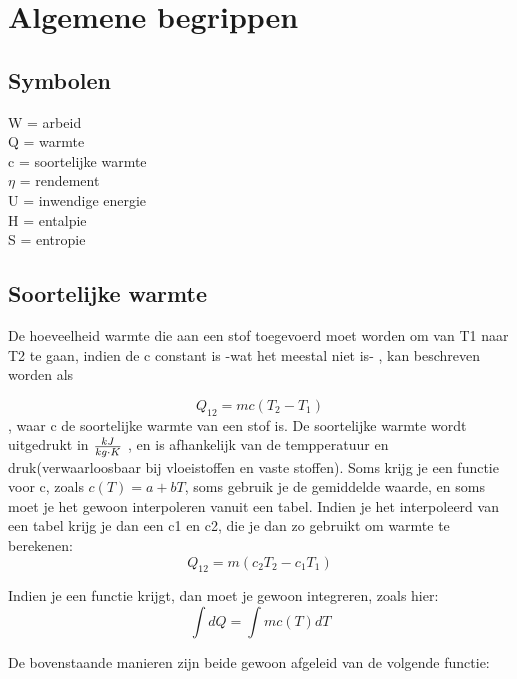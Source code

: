 \documentclass[12pt]{extarticle} %
\begin{document}
\newcommand\abs[1]{\left|#1\right|} %
\newcommand\magnitude[1]{\left\Vert #1 \right\Vert}
\newcommand\vectoo[1]{\begin{bmatrix} #1 \end{bmatrix}}
\newcommand{\seq}[2][0]{\left\{ #2 \right\}_{n=#1}}
\newtheorem{theorem}{Theorem}
\newtheorem*{theorem*}{Theorem}
\newtheorem*{definition}{Definition}

\section{Algemene begrippen}

\subsection{Symbolen}


    W = arbeid \\
Q = warmte \\
c = soortelijke warmte \\
$\eta$ = rendement \\
U = inwendige energie \\
H = entalpie \\ 
S = entropie


\subsection{Soortelijke warmte}

De hoeveelheid warmte die aan een stof toegevoerd moet worden om van T1 naar T2 te gaan,
indien de c constant is -wat het meestal niet is- , 
kan beschreven worden als

$$
    Q_{12} = m c (T_2 - T_1)  
$$, waar c de soortelijke warmte van een stof is. De soortelijke warmte wordt uitgedrukt in ${kJ \over kg \cdot K}$
, en is afhankelijk van de tempperatuur en druk(verwaarloosbaar bij vloeistoffen en vaste stoffen).
Soms krijg je een functie voor c, zoals $c(T) = a + bT$, soms gebruik je de gemiddelde waarde, en soms moet je het gewoon interpoleren vanuit een tabel. 
Indien je het interpoleerd van een tabel krijg je dan een c1 en c2, die je dan zo gebruikt om warmte te berekenen:
$$
Q_{12} = m (c_2  T_2 - c_1 T_1)
$$

Indien je een functie krijgt, dan moet je gewoon integreren, zoals hier:
$$
\int dQ = \int m c(T) dT
$$

De bovenstaande manieren zijn beide gewoon afgeleid van de volgende functie:
\end{document}
